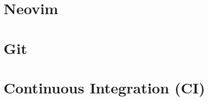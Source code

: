 \documentclass{article}
\begin{document}
\title{}
\author{Muchang Bahng}
\date{Fall 2024}

\maketitle
\tableofcontents
\pagebreak

\section{Neovim} 

\section{Git} 

\section{Continuous Integration (CI)} 

\section{}
\end{document}

